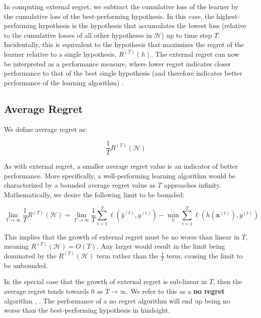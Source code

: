 \documentclass[11pt]{article}
\begin{document}
In computing external regret, we subtract the cumulative loss of the learner by the cumulative loss of the best-performing hypothesis. In this case, the highest-performing hypothesis is the hypothesis that accumulates the lowest loss (relative to the cumulative losses of all other hypotheses in $\mathcal{H}$) up to time step $T$. Incidentally, this is equivalent to the hypothesis that maximizes the regret of the learner relative to a single hypothesis, $R^{(T)}(h)$. The external regret can now be interpreted as a performance measure, where lower regret indicates closer performance to that of the best single hypothesis (and therefore indicates better performance of the learning algorithm) \cite{hoi2018online}.

\subsection{Average Regret}

We define average regret as:

$$\frac{1}{T}R^{(T)}(\mathcal{H}) $$

As with external regret, a smaller average regret value is an indicator of better performance. More specifically, a well-performing learning algorithm would be characterized by a bounded average regret value as $T$ approaches infinity. Mathematically, we desire the following limit to be bounded:

$$\lim_{T\rightarrow\infty}\frac{1}{T}R^{(T)}(\mathcal{H}) = \lim_{T\rightarrow\infty}\frac{1}{T}\sum_{t=1}^T{\ell(\hat{y}^{(t)},y^{(t)})} - 
\min_h\sum_{t=1}^T{\ell(h(\boldsymbol{x}^{(t)}),y^{(t)})} $$

This implies that the growth of external regret must be no worse than linear in $T$, meaning $R^{(T)}(\mathcal{H})=O(T)$. Any larger would result in the limit being dominated by the $R^{(T)}(\mathcal{H})$ term rather than the $\frac{1}{T}$ term, causing the limit to be unbounded.

In the special case that the growth of external regret is sub-linear in $T$, then the average regret tends towards 0 as $T\rightarrow\infty$. We refer to this as a \textbf{no regret} algorithm \cite{hoi2018online}, \cite{orabona}. The performance of a no regret algorithm will end up being no worse than the best-performing hypothesis in hindsight.

{


}
\end{document}
